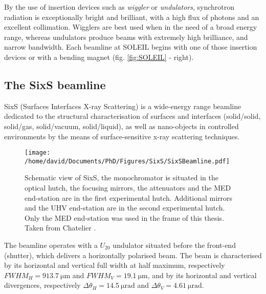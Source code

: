 By the use of insertion devices such as \textit{wiggler} or \textit{undulators}, synchrotron radiation is exceptionally bright and brilliant, with a high flux of photons and an excellent collimation.
Wigglers are best used when in the need of a broad energy range, whereas undulators produce beams with extremely high brilliance, and narrow bandwidth.
Each beamline at SOLEIL begins with one of those insertion devices or with a bending magnet (fig. \ref{fig:SOLEIL} - right).

\subsection{The SixS beamline}

SixS (Surfaces Interfaces X-ray Scattering) is a wide-energy range beamline dedicated to the structural characterisation of surfaces and interfaces (solid/solid, solid/gas, solid/vacuum, solid/liquid), as well as nano-objects in controlled environments by the means of surface-sensitive x-ray scattering techniques.

\begin{figure}[!htb]
    \centering
    \texttt{[image: /home/david/Documents/PhD/Figures/SixS/SixSBeamline.pdf]}
    \caption{
		Schematic view of SixS, the monochromator is situated in the optical hutch, the focusing mirrors, the attenuators and the MED end-station are in the first experimental hutch.
        Additional mirrors and the UHV end-station are in the second experimental hutch.
		Only the MED end-station was used in the frame of this thesis.
        Taken from Chatelier \parencite*{Chatelier2020}.
    }
    \label{fig:SixSBeamline}
\end{figure}

The beamline operates with a $U_{20}$ undulator situated before the front-end (shutter), which delivers a horizontally polarised beam.
The beam is characterised by its horizontal and vertical full width at half maximum, respectively $FWHM_H = \qty{913.7}{\um}$ and $FWHM_V = \qty{19.1}{\um}$, and by its horizontal and vertical divergences, respectively $\Delta\theta_H = \qty{14.5}{\micro\radian}$ and $\Delta\theta_V = \qty{4.61}{\micro\radian}$.

